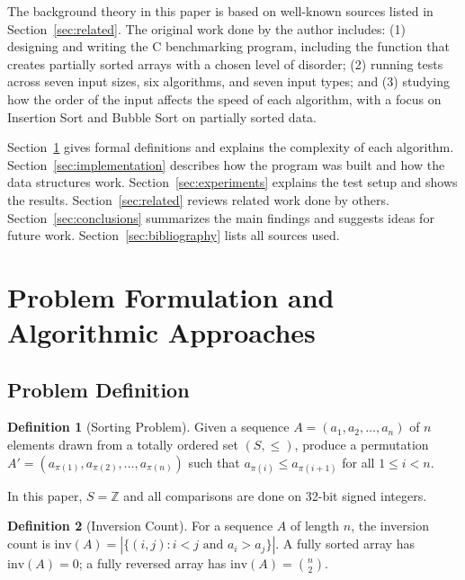 \documentclass[12pt,a4paper]{article}
\theoremstyle{definition}
\newtheorem{definition}{Definition}[section]
\begin{document}
The background theory in this paper is based on well-known sources listed in Section~\ref{sec:related}. The original work done by the author includes: (1) designing and writing the C benchmarking program, including the function that creates partially sorted arrays with a chosen level of disorder; (2) running tests across seven input sizes, six algorithms, and seven input types; and (3) studying how the order of the input affects the speed of each algorithm, with a focus on Insertion Sort and Bubble Sort on partially sorted data.

Section~\ref{sec:formal} gives formal definitions and explains the complexity of each algorithm. Section~\ref{sec:implementation} describes how the program was built and how the data structures work. Section~\ref{sec:experiments} explains the test setup and shows the results. Section~\ref{sec:related} reviews related work done by others. Section~\ref{sec:conclusions} summarizes the main findings and suggests ideas for future work. Section~\ref{sec:bibliography} lists all sources used.

\section{Problem Formulation and Algorithmic Approaches}
\label{sec:formal}

\subsection{Problem Definition}

\begin{definition}[Sorting Problem]\cite{knuth1998,cormen2022}
Given a sequence $A = (a_1, a_2, \ldots, a_n)$ of $n$ elements drawn from a totally ordered set $(S, \leq)$, produce a permutation $A' = (a_{\pi(1)}, a_{\pi(2)}, \ldots, a_{\pi(n)})$ such that $a_{\pi(i)} \leq a_{\pi(i+1)}$ for all $1 \leq i < n$.
\end{definition}

In this paper, $S = \mathbb{Z}$ and all comparisons are done on 32-bit signed integers.

\begin{definition}[Inversion Count]\cite{cormen2022,knuth1998}
For a sequence $A$ of length $n$, the inversion count is $\text{inv}(A) = |\{(i,j) : i < j \text{ and } a_i > a_j\}|$. A fully sorted array has $\text{inv}(A) = 0$; a fully reversed array has $\text{inv}(A) = \binom{n}{2}$.
\end{definition}
\end{document}
